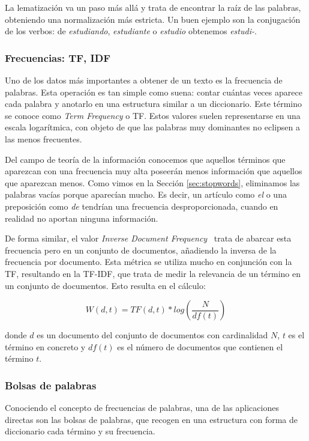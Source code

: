 La lematización va un paso más allá y trata de encontrar la raíz de las palabras, obteniendo una normalización más estricta. Un buen ejemplo son la conjugación de los verbos: de \textit{estudiando}, \textit{estudiante} o \textit{estudio} obtenemos \textit{estudi-}. \cite{Lemmatization2014} 


\subsubsection{Frecuencias: TF, IDF}
\label{sec:tfidf}
Uno de los datos más importantes a obtener de un texto es la frecuencia de palabras. Esta operación es tan simple como suena: contar cuántas veces aparece cada palabra y anotarlo en una estructura similar a un diccionario. Este término se conoce como \textit{Term Frequency} o TF. Estos valores suelen representarse en una escala logarítmica, con objeto de que las palabras muy dominantes no eclipsen a las menos frecuentes.

Del campo de teoría de la información \cite{information2001} conocemos que aquellos términos que aparezcan con una frecuencia muy alta poseerán menos información que aquellos que aparezcan menos. Como vimos en la  Sección \ref{sec:stopwords}, eliminamos las palabras vacías porque aparecían mucho. Es decir, un artículo como \textit{el} o una preposición como \textit{de} tendrían una frecuencia desproporcionada, cuando en realidad no aportan ninguna información. 


De forma similar, el valor \textit{Inverse Document Frequency}~\cite{Jones2004ASI} trata de abarcar esta frecuencia pero en un conjunto de documentos, añadiendo la inversa de la frecuencia por documento. Esta métrica se utiliza mucho en conjunción con la TF, resultando en la TF-IDF, que trata de medir la relevancia de un término en un conjunto de documentos. Esto resulta en el cálculo:

\begin{equation}
    W(d, t) = TF(d, t) * log(\frac{N}{df(t)})
\end{equation}

donde $d$ es un documento del conjunto de documentos con cardinalidad $N$, $t$ es el término en concreto y $df(t)$ es el número de documentos que contienen el término $t$.

\subsubsection{Bolsas de palabras}
Conociendo el concepto de frecuencias de palabras, una de las aplicaciones directas son las bolsas de palabras, que recogen en una estructura con forma de diccionario cada término y su frecuencia.

